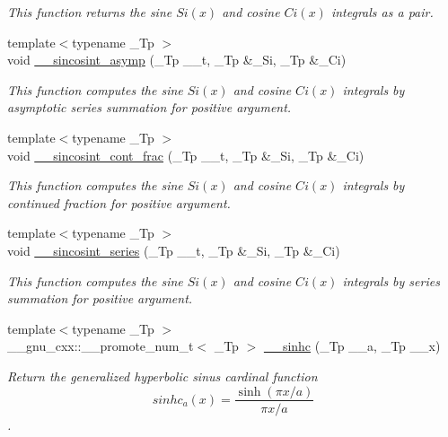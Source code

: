 \begin{DoxyCompactItemize}
\begin{DoxyCompactList}\small\item\em This function returns the sine $ Si(x) $ and cosine $ Ci(x) $ integrals as a {\ttfamily pair}. \end{DoxyCompactList}\item 
{\footnotesize template$<$typename \+\_\+\+Tp $>$ }\\void \hyperlink{namespacestd_1_1____detail_a976c3ff52c54001de3d409900c9bcb9c}{\+\_\+\+\_\+sincosint\+\_\+asymp} (\+\_\+\+Tp \+\_\+\+\_\+t, \+\_\+\+Tp \&\+\_\+\+Si, \+\_\+\+Tp \&\+\_\+\+Ci)
\begin{DoxyCompactList}\small\item\em This function computes the sine $ Si(x) $ and cosine $ Ci(x) $ integrals by asymptotic series summation for positive argument. \end{DoxyCompactList}\item 
{\footnotesize template$<$typename \+\_\+\+Tp $>$ }\\void \hyperlink{namespacestd_1_1____detail_a211f552bca2944f64e3a1f5593690fda}{\+\_\+\+\_\+sincosint\+\_\+cont\+\_\+frac} (\+\_\+\+Tp \+\_\+\+\_\+t, \+\_\+\+Tp \&\+\_\+\+Si, \+\_\+\+Tp \&\+\_\+\+Ci)
\begin{DoxyCompactList}\small\item\em This function computes the sine $ Si(x) $ and cosine $ Ci(x) $ integrals by continued fraction for positive argument. \end{DoxyCompactList}\item 
{\footnotesize template$<$typename \+\_\+\+Tp $>$ }\\void \hyperlink{namespacestd_1_1____detail_aea85e0044476065ed4a067f1aa9647cb}{\+\_\+\+\_\+sincosint\+\_\+series} (\+\_\+\+Tp \+\_\+\+\_\+t, \+\_\+\+Tp \&\+\_\+\+Si, \+\_\+\+Tp \&\+\_\+\+Ci)
\begin{DoxyCompactList}\small\item\em This function computes the sine $ Si(x) $ and cosine $ Ci(x) $ integrals by series summation for positive argument. \end{DoxyCompactList}\item 
{\footnotesize template$<$typename \+\_\+\+Tp $>$ }\\\+\_\+\+\_\+gnu\+\_\+cxx\+::\+\_\+\+\_\+promote\+\_\+num\+\_\+t$<$ \+\_\+\+Tp $>$ \hyperlink{namespacestd_1_1____detail_a04f920f7abd50780445c68fd5468d6b5}{\+\_\+\+\_\+sinhc} (\+\_\+\+Tp \+\_\+\+\_\+a, \+\_\+\+Tp \+\_\+\+\_\+x)
\begin{DoxyCompactList}\small\item\em Return the generalized hyperbolic sinus cardinal function \[ sinhc_a(x) = \frac{\sinh(\pi x / a)}{\pi x / a} \]. \end{DoxyCompactList}\item 

\end{DoxyCompactItemize}
